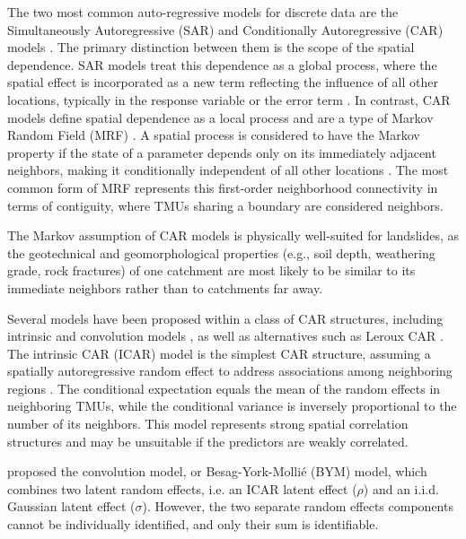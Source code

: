 \documentclass[journal abbreviation, manuscript]{copernicus}
\begin{document}
The two most common auto-regressive models for discrete data are the Simultaneously Autoregressive (SAR) and Conditionally Autoregressive (CAR) models \citep{jaya2021spatial}. The primary distinction between them is the scope of the spatial dependence. SAR models treat this dependence as a global process, where the spatial effect is incorporated as a new term reflecting the influence of all other locations, typically in the response variable or the error term \citep{hooten2014simultaneous, anselin1988spatial}. In contrast, CAR models define spatial dependence as a local process and are a type of Markov Random Field (MRF) \citep{earnest2007evaluating, besag1991bayesian}. A spatial process is considered to have the Markov property if the state of a parameter depends only on its immediately adjacent neighbors, making it conditionally independent of all other locations \citep{clifford1990markov, rue2005gaussian}. The most common form of MRF represents this first-order neighborhood connectivity in terms of contiguity, where TMUs sharing a boundary are considered neighbors.

The Markov assumption of CAR models is physically well-suited for landslides, as the geotechnical and geomorphological properties (e.g., soil depth, weathering grade, rock fractures) of one catchment are most likely to be similar to its immediate neighbors rather than to catchments far away.

Several models have been proposed within a class of CAR structures, including intrinsic and convolution models \citep{besag1991bayesian}, as well as alternatives such as Leroux CAR \citep{leroux2000estimation}. The intrinsic CAR (ICAR) model is the simplest CAR structure, assuming a spatially autoregressive random effect to address associations among neighboring regions \citep{besag1991bayesian}. The conditional expectation equals the mean of the random effects in neighboring TMUs, while the conditional variance is inversely proportional to the number of its neighbors. This model represents strong spatial correlation structures and may be unsuitable if the predictors are weakly correlated.

\citet{besag1991bayesian} proposed the convolution model, or Besag-York-Molli\'{e} (BYM) model, which combines two latent random effects, i.e. an ICAR latent effect ($\rho$) and an i.i.d. Gaussian latent effect ($\sigma$). However, the two separate random effects components cannot be individually identified, and only their sum is identifiable.
\end{document}
